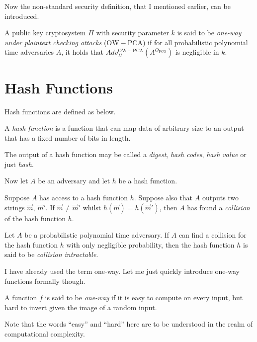 Now the non-standard security definition, that I mentioned earlier, can be introduced.
\begin{defi}
\label{def:owpca}
	A public key cryptosystem $\Pi$ with security parameter $k$ is said to be \emph{one-way under plaintext checking attacks} (\emph{$\mathrm{OW-PCA}$}) if for all probabilistic polynomial time adversaries $A$, it holds that $Adv_{\Pi}^{\mathrm{OW-PCA}}\left( A^{O_{\mathrm{PCO}}} \right) $ is negligible in $k$.
\end{defi}



\section{Hash Functions}
\label{sec:hashFunctions}

Hash functions are defined as below.
\begin{defi}
\label{def:hashFunctions}
	A \emph{hash function} is a function that can map data of arbitrary size to an output that has a fixed number of bits in length.
\end{defi}
The output of a hash function may be called a \emph{digest}, \emph{hash codes}, \emph{hash value} or just \emph{hash}.

Now let $A$ be an adversary and let $h$ be a hash function.
\begin{defi}[Collision]
\label{def:collision}
	Suppose $A$ has access to a hash function $h$. Suppose also that $A$ outputs two strings $\vec{m}$, $\vec{m}'$. If $\vec{m} \neq \vec{m}'$ whilst $h\left(\vec{m}\right) = h\left(\vec{m}'\right)$, then $A$ has found a \emph{collision} of the hash function $h$.
\end{defi}
\begin{defi}
\label{def:collIntr}
	Let $A$ be a probabilistic polynomial time adversary. If $A$ can find a collision for the hash function $h$ with only negligible probability, then the hash function $h$ is said to be \emph{collision intractable}.
\end{defi}

I have already used the term one-way. Let me just quickly introduce one-way functions formally though.
\begin{def}
\label{def:oneWayFunction}
	A function $f$ is said to be \emph{one-way} if it is easy to compute on every input, but hard to invert given the image of a random input.
\end{def}
Note that the words ``easy'' and ``hard'' here are to be understood in the realm of computational complexity.

